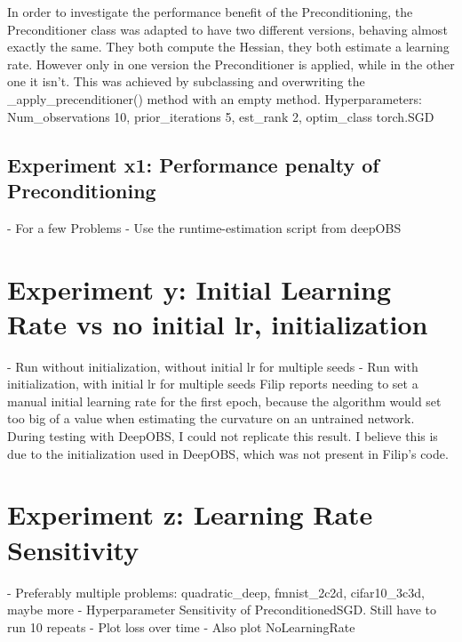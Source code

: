 \documentclass[twoside,12pt,a4paper]{report}
\begin{document}
In order to investigate the performance benefit of the Preconditioning, the Preconditioner class was adapted to have two different versions, behaving almost exactly the same. They both compute the Hessian, they both estimate a learning rate. However only in one version the Preconditioner is applied, while in the other one it isn't. This was achieved by subclassing and overwriting the \_apply\_precenditioner() method with an empty method. Hyperparameters: Num\_observations 10, prior\_iterations 5, est\_rank 2, optim\_class torch.SGD

\subsection{Experiment x1: Performance penalty of Preconditioning}
- For a few Problems
- Use the runtime-estimation script from deepOBS

\section{Experiment y: Initial Learning Rate vs no initial lr, initialization}
- Run without initialization, without initial lr for multiple seeds
- Run with initialization, with initial lr for multiple seeds
Filip reports needing to set a manual initial learning rate for the first epoch, because the algorithm would set too big of a value when estimating the curvature on an untrained network. During testing with DeepOBS, I could not replicate this result. I believe this is due to the initialization used in DeepOBS, which was not present in Filip's code.

\section{Experiment z: Learning Rate Sensitivity}
- Preferably multiple problems: quadratic\_deep, fmnist\_2c2d, cifar10\_3c3d, maybe more
- Hyperparameter Sensitivity of PreconditionedSGD. Still have to run 10 repeats
- Plot loss over time
- Also plot NoLearningRate
\end{document}
